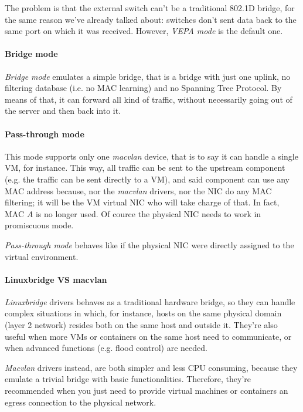 \noindent
The problem is that the external switch can't be a traditional 802.1D bridge, for
the same reason we've already talked about: switches don't sent data back to
the same port on which it was received. However, \emph{VEPA mode} is the default
one.

\paragraph{Bridge mode}
\emph{Bridge mode} emulates a simple bridge, that is a bridge with just one
uplink, no filtering database (i.e. no MAC learning) and no Spanning Tree
Protocol. By means of that, it can forward all kind of traffic, without
necessarily going out of the server and then back into it.

\paragraph{Pass-through mode}
This mode supports only one \emph{macvlan} device, that is to say it can handle
a single VM, for instance. This way, all traffic can be sent to the upstream
component (e.g. the traffic can be sent directly to a VM), and said component
can use any MAC address because, nor the \emph{macvlan} drivers, nor the NIC
do any MAC filtering; it will be the VM virtual NIC who will take charge of that.
In fact, MAC $A$ is no longer used. Of cource the physical NIC needs to work in
promiscuous mode.

\begin{note}
    \emph{Pass-through mode} behaves like if the physical NIC were directly
    assigned to the virtual environment.
\end{note}

\paragraph{Linuxbridge VS macvlan}
\emph{Linuxbridge} drivers behaves as a traditional hardware bridge, so they can
handle complex situations in which, for instance, hosts on the same physical
domain (layer 2 network) resides both on the same host and outside it. They're
also useful when more VMs or containers on the same host need to communicate,
or when advanced functions (e.g. flood control) are needed.

\emph{Macvlan} drivers instead, are both simpler and less CPU consuming, because
they emulate a trivial bridge with basic functionalities. Therefore, they're
recommended when you just need to provide virtual machines or containers an
egress connection to the physical network.

